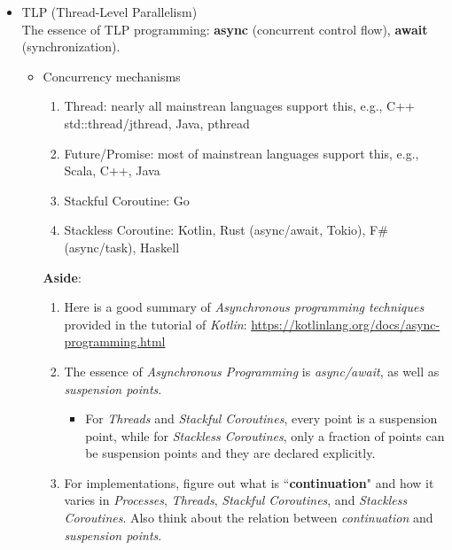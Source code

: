 \documentclass{article}
\begin{document}
\begin{itemize}
    \item TLP (Thread-Level Parallelism)\\
    The essence of TLP programming: \textbf{async} (concurrent control flow), \textbf{await} (synchronization).
    \begin{itemize}
        \item Concurrency mechanisms
        \begin{enumerate}
            \item Thread: nearly all mainstrean languages support this, e.g., C++ std::thread/jthread, Java, pthread
            \item Future/Promise: most of mainstrean languages support this,  e.g., Scala, C++, Java
            \item Stackful Coroutine: Go
            \item Stackless Coroutine: Kotlin, Rust (async/await, Tokio), F\# (async/task), Haskell
        \end{enumerate}
        \textbf{Aside}:
        \begin{enumerate}
                \item Here is a good summary of \emph{Asynchronous programming techniques} provided in the tutorial of \emph{Kotlin}:
            \href{https://kotlinlang.org/docs/async-programming.html}{https://kotlinlang.org/docs/async-programming.html}
            \item The essence of \emph{Asynchronous Programming} is \emph{async/await}, as well as \emph{suspension points}.
            \begin{itemize}
                \item For \emph{Threads} and \emph{Stackful Coroutines}, every point is a suspension point, while for \emph{Stackless Coroutines}, only a fraction of points can be suspension points and they are declared explicitly.
            \end{itemize}
            \item For implementations, figure out what is ``\textbf{continuation}" and how it varies in \emph{Processes}, \emph{Threads}, \emph{Stackful Coroutines}, and \emph{Stackless Coroutines}.
            Also think about the relation between \emph{continuation} and \emph{suspension points}.
        \end{enumerate}


\end{itemize}
\end{itemize}
\end{document}
